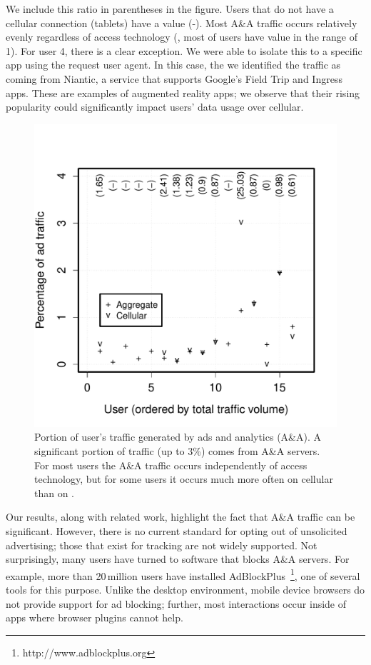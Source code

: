 We include this ratio in parentheses in the figure. Users that do not have a cellular connection (tablets) have a value (-).
Most A\&A traffic occurs relatively evenly regardless of access technology (\ie, most of users have value in the range of 1).
For user 4, there is a clear exception. We were able to isolate this to a 
specific app using the request user agent. In this case, the we identified the traffic as 
coming from Niantic, a service that supports Google's Field Trip and Ingress apps. These 
are examples of augmented reality apps; we observe that their rising popularity could significantly 
impact users' data usage over cellular. 


\begin{figure}
\centering
        \includegraphics[width=\linewidth]{./plots/userAdsShare}
  \caption{Portion of user's traffic generated by ads and analytics (A\&A). A significant 
  portion of traffic (up to 3\%) comes from A\&A servers. For most users the A\&A 
  traffic occurs independently of access technology, but for some users it occurs 
  much more often on cellular than on \wifi. }
  \label{fig:adblocking}
\end{figure}


Our results, along with related work, highlight the fact that A\&A traffic can be 
significant. However, there is no current standard for opting 
out of unsolicited advertising; those that exist for tracking are not widely supported. 
Not surprisingly, many users have turned to software that blocks A\&A servers. 
For example, more than 20\,million users have installed 
AdBlockPlus~\footnote{http://www.adblockplus.org}, one of several tools for this purpose. 
Unlike the desktop environment, mobile device browsers do not provide support for 
ad blocking; further, most interactions occur inside of apps where browser plugins 
cannot help. 

